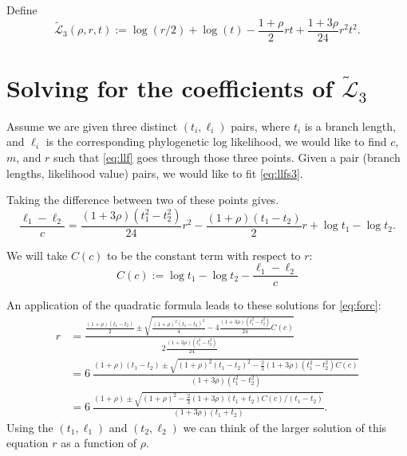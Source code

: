 \documentclass{amsart}
\newcommand{\llf}{\mathcal{L}}   %
\newcommand{\llfs}{\tilde{\llf}}
\newcommand{\loglike}{\ell}           %
\begin{document}
Define
\begin{equation}
  \llfs_3(\rho,r,t) := \log(r/2) + \log(t) - \frac{1+\rho}{2} r t + \frac{1+3 \rho}{24} r^2 t^2.
  \label{eq:llfs3}
\end{equation}

\section{Solving for the coefficients of $\llfs_3$}

Assume we are given three distinct $(t_i, \loglike_i)$ pairs, where $t_i$ is a branch length, and $\loglike_i$ is the corresponding phylogenetic log likelihood, we would like to find $c$, $m$, and $r$ such that \eqref{eq:llf} goes through those three points.
Given a pair (branch lengths, likelihood value) pairs, we would like to fit \eqref{eq:llfs3}.


Taking the difference between two of these points gives.
\begin{equation}
  \frac{\loglike_1 - \loglike_2}{c} = \frac{(1+3 \rho)(t_1^2 - t_2^2)}{24} r^2 - \frac{(1+\rho) (t_1 - t_2)}{2} r + \log t_1 - \log t_2.
  \label{eq:forc}
\end{equation}

We will take $C(c)$ to be the constant term with respect to $r$:
\begin{equation}
  C(c) := \log t_1 - \log t_2 - \frac{\loglike_1 - \loglike_2}{c}
\end{equation}

An application of the quadratic formula leads to these solutions for \eqref{eq:forc}:
\begin{equation}
  \begin{split}
  r & = \frac{\frac{(1+\rho) (t_1 - t_2)}{2} \pm \sqrt{\frac{(1+\rho)^2 (t_1 - t_2)^2}{4} - 4 \frac{(1+3 \rho)(t_1^2 - t_2^2)}{24} C(c)}}
  {2 \frac{(1+3 \rho)(t_1^2 - t_2^2)}{24}} \\
    & = 6 \ \frac{(1+\rho) (t_1 - t_2) \pm \sqrt{(1+\rho)^2 (t_1 - t_2)^2 - \frac{2}{3} (1+3 \rho)(t_1^2 - t_2^2) C(c)}}
	  {(1+3 \rho)(t_1^2 - t_2^2)} \\
    & = 6 \ \frac{(1+\rho) \pm \sqrt{(1+\rho)^2 - \frac{2}{3} (1+3 \rho)(t_1 + t_2) C(c) / (t_1 - t_2)}}
	  {(1+3 \rho)(t_1 + t_2)}.
  \end{split}
  \label{eq:forc}
\end{equation}
Using the $(t_1, \loglike_1)$ and $(t_2, \loglike_2)$ we can think of the larger solution of this equation $r$ as a function of $\rho$.
\end{document}
